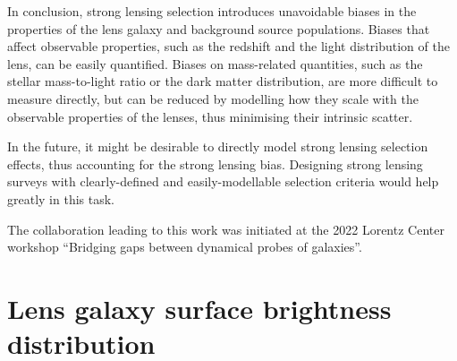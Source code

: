 \documentclass{aa}
\begin{document}
In conclusion, strong lensing selection introduces unavoidable biases in the properties of the lens galaxy and background source populations.
Biases that affect observable properties, such as the redshift and the light distribution of the lens, can be easily quantified.
Biases on mass-related quantities, such as the stellar mass-to-light ratio or the dark matter distribution, are more difficult to measure directly, but can be reduced by modelling how they scale with the observable properties of the lenses, thus minimising their intrinsic scatter.

In the future, it might be desirable to directly model strong lensing selection effects, thus accounting for the strong lensing bias.
Designing strong lensing surveys with clearly-defined and easily-modellable selection criteria would help greatly in this task.

\begin{acknowledgements}

The collaboration leading to this work was initiated at the 2022 Lorentz Center workshop “Bridging gaps between dynamical probes of galaxies”.

\end{acknowledgements}






\appendix
\section{Lens galaxy surface brightness distribution}\label{sect:appendixa}
\end{document}
